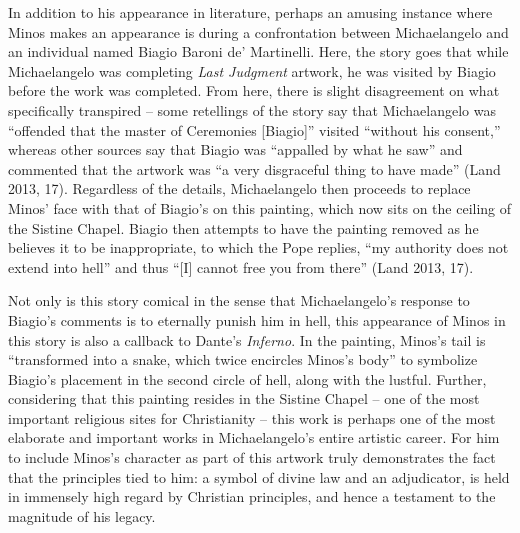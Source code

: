 \documentclass[12pt]{article}
\begin{document}
	In addition to his appearance in literature, perhaps an amusing instance where Minos makes an appearance is during 
	a confrontation between Michaelangelo and an individual named Biagio Baroni de' Martinelli. Here, the story 
	goes that while Michaelangelo was completing \textit{Last Judgment} artwork, he was visited by Biagio before the 
	work was completed. From here, there is slight disagreement on what specifically transpired -- some retellings 
	of the story say that Michaelangelo was ``offended that the master of Ceremonies [Biagio]'' visited 
	``without his consent,'' whereas other sources say that Biagio was ``appalled by what he saw'' and commented 
	that the artwork was ``a very disgraceful thing to have made'' (Land 2013, 17). Regardless of the details, 
	Michaelangelo then proceeds to replace Minos' face with that of Biagio's on this painting, which now sits 
	on the ceiling of the Sistine Chapel. Biagio then attempts to have the painting removed as he believes it to be
	inappropriate, to which the Pope replies, ``my authority does not extend into hell'' and thus ``[I] cannot free 
	you from there'' (Land 2013, 17).  

	Not only is this story comical in the sense that Michaelangelo's response to Biagio's comments is to eternally 
	punish him in hell, this appearance of Minos in this story is also a callback to Dante's \textit{Inferno}. In the 
	painting, Minos's tail is ``transformed into a snake, which twice encircles Minos's body'' 
	to symbolize Biagio's placement in the second circle of hell, along with the lustful. Further, considering that 
	this painting resides in the Sistine Chapel -- one of the most important religious sites 
	for Christianity -- this work is perhaps one of the most elaborate and important works in Michaelangelo's 
	entire artistic career. For him to include Minos's character as part of this artwork truly demonstrates the 
	fact that the principles tied to him: a symbol of divine law and an adjudicator, is held in immensely high 
	regard by Christian principles, and hence a testament to the magnitude of his legacy.  
	
\end{document}
